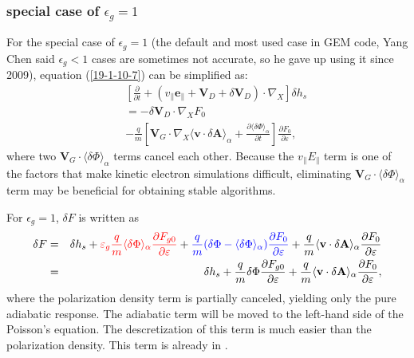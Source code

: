 \documentclass{llncs}
\newcommand{\tmcolor}[2]{{\color{#1}{#2}}}
\begin{document}
\subsubsection{special case of $\epsilon_g = 1$}

For the special case of $\epsilon_g = 1$ (the default and most used case in
GEM code, Yang Chen said $\epsilon_g < 1$ cases are sometimes not accurate, so
he gave up using it since 2009), equation (\ref{19-1-10-7}) can be simplified
as:
\begin{eqnarray}
  &  & \left[ \frac{\partial}{\partial t} + (v_{\parallel}
  \mathbf{e}_{\parallel} +\mathbf{V}_D + \delta \mathbf{V}_D) \cdot \nabla_X
  \right] \delta h_s \nonumber\\
  &  & = - \delta \mathbf{V}_D \cdot \nabla_X F_0 \nonumber\\
  &  & - \frac{q}{m} \left[ \mathbf{V}_G \cdot \nabla_X \langle \mathbf{v}
  \cdot \delta \mathbf{A} \rangle_{\alpha} + \frac{\partial \langle \delta
  \Phi \rangle_{\alpha}}{\partial t} \right] \frac{\partial F_0}{\partial
  \varepsilon},  \label{19-1-10-7m2}
\end{eqnarray}
where two $\mathbf{V}_G \cdot \langle \delta \Phi \rangle_{\alpha}$ terms
cancel each other. Because the $v_{\parallel} E_{\parallel}$ term is one of
the factors that make kinetic electron simulations difficult, eliminating
$\mathbf{V}_G \cdot \langle \delta \Phi \rangle_{\alpha}$ term may be
beneficial for obtaining stable algorithms.

For $\epsilon_g = 1$, $\delta F$ is written as
\begin{eqnarray}
  \delta F & = & \delta h_s + \tmcolor{red}{\varepsilon_g \frac{q}{m} \langle
  \delta \Phi \rangle_{\alpha} \frac{\partial F_{g 0}}{\partial \varepsilon}}
  + \tmcolor{blue}{\frac{q}{m} (\delta \Phi - \langle \delta \Phi
  \rangle_{\alpha}) \frac{\partial F_0}{\partial \varepsilon}} + \frac{q}{m}
  \langle \mathbf{v} \cdot \delta \mathbf{A} \rangle_{\alpha} \frac{\partial
  F_0}{\partial \varepsilon} \nonumber\\
  & = & \delta h_s + \frac{q}{m} \delta \Phi \frac{\partial F_{g 0}}{\partial
  \varepsilon} + \frac{q}{m} \langle \mathbf{v} \cdot \delta \mathbf{A}
  \rangle_{\alpha} \frac{\partial F_0}{\partial \varepsilon}, 
\end{eqnarray}
where the polarization density term is partially canceled, yielding only the
pure adiabatic response. The adiabatic term will be moved to the left-hand
side of the Poisson's equation. The descretization of this term is much easier
than the polarization density. This term is already in {}.
\end{document}
